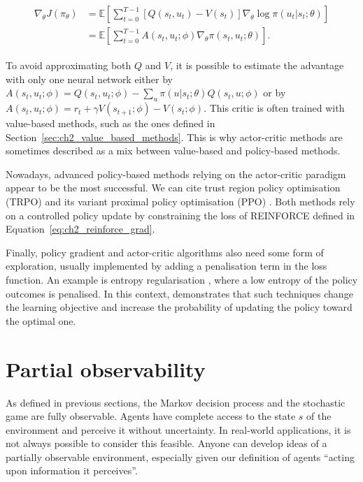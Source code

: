 \begin{align}
\begin{split}
\label{eq:ch2_baseline_actor_crit}
    \nabla_\theta J(\pi_\theta)
    & = \mathbb{E}\left[\sum_{t=0}^{T-1} [Q(s_t, u_t) - V(s_t)] \nabla_\theta \log \pi(u_t|s_t;\theta)\right]\\
    & = \mathbb{E} \left[\sum_{t=0}^{T-1} A(s_t, u_t; \phi) \nabla_\theta \pi(s_t, u_t; \theta)\right].
\end{split}
\end{align}

To avoid approximating both $Q$ and $V$, it is possible to estimate the advantage with only one neural network either by $A(s_t,u_t; \phi)=Q(s_t, u_t;\phi)-\sum_u \pi(u|s_t;\theta) Q(s_t,u; \phi)$ or by $A(s_t,u_t; \phi)=r_t +\gamma V(s_{t+1};\phi) - V(s_t;\phi)$.
This critic is often trained with value-based methods, such as the ones defined in Section~\ref{sec:ch2_value_based_methods}.
This is why actor-critic methods are sometimes described as a mix between value-based and policy-based methods.

Nowadays, advanced policy-based methods relying on the actor-critic paradigm appear to be the most successful.
We can cite trust region policy optimisation (TRPO) \citep{schulman2015trust} and its variant proximal policy optimisation (PPO) \citep{schulman2017ppo}.
Both methods rely on a controlled policy update by constraining the loss of REINFORCE defined in Equation~\ref{eq:ch2_reinforce_grad}.

Finally, policy gradient and actor-critic algorithms also need some form of exploration, usually implemented by adding a penalisation term in the loss function. 
An example is entropy regularisation \citep{williams1991function}, where a low entropy of the policy outcomes is penalised.
In this context, \cite{bolland2024behind} demonstrates that such techniques change the learning objective and increase the probability of updating the policy toward the optimal one.

\section{Partial observability} \label{sec:ch2_partial_observability}

As defined in previous sections, the Markov decision process and the stochastic game are fully observable.
Agents have complete access to the state $s$ of the environment and perceive it without uncertainty.
In real-world applications, it is not always possible to consider this feasible.
Anyone can develop ideas of a partially observable environment, especially given our definition of agents ``acting upon information it perceives''.

